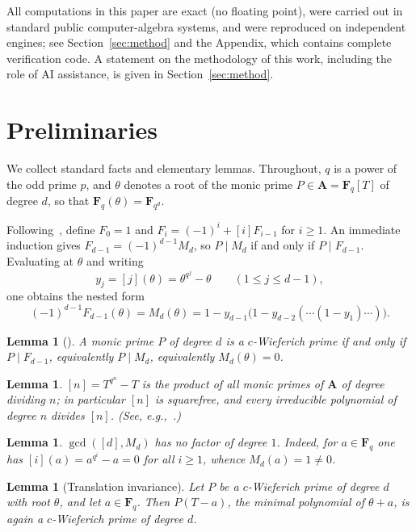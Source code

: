 \documentclass[10pt,a4paper]{amsart}
\newcommand{\A}{\mathbf{A}}
\newcommand{\F}{\mathbf{F}}
\newtheorem{lemma}[theorem]{Lemma}
\begin{document}
All computations in this paper are exact (no floating point), were carried out
in standard public computer-algebra systems, and were reproduced on independent
engines; see Section~\ref{sec:method} and the Appendix, which contains complete
verification code. A statement on the methodology of this work, including the
role of AI assistance, is given in Section~\ref{sec:method}.

\section{Preliminaries}

We collect standard facts and elementary lemmas. Throughout, $q$ is a power of
the odd prime $p$, and $\theta$ denotes a root of the monic prime
$P\in\A=\F_q[T]$ of degree $d$, so that $\F_q(\theta)=\F_{q^d}$.

Following~\cite{BB}, define $F_0=1$ and $F_i=(-1)^i+[i]F_{i-1}$ for $i\ge1$. An
immediate induction gives $F_{d-1}=(-1)^{d-1}M_d$, so $P\mid M_d$ if and only if
$P\mid F_{d-1}$. Evaluating at $\theta$ and writing
\[
y_j=[j](\theta)=\theta^{q^j}-\theta\qquad(1\le j\le d-1),
\]
one obtains the nested form
\begin{equation}\label{eq:nested}
(-1)^{d-1}F_{d-1}(\theta)=M_d(\theta)=1-y_{d-1}\bigl(1-y_{d-2}(\cdots(1-y_1)\cdots)\bigr).
\end{equation}

\begin{lemma}[{\cite[Prop.~1.2]{BB}}]\label{lem:equiv}
A monic prime $P$ of degree $d$ is a $c$-Wieferich prime if and only if
$P\mid F_{d-1}$, equivalently $P\mid M_d$, equivalently $M_d(\theta)=0$.
\end{lemma}

\begin{lemma}\label{lem:sqfree}
$[n]=T^{q^n}-T$ is the product of all monic primes of $\A$ of degree dividing
$n$; in particular $[n]$ is squarefree, and every irreducible polynomial of
degree $n$ divides $[n]$. (See, e.g.,~\cite[Ch.~2]{Ros}.)
\end{lemma}

\begin{lemma}\label{lem:nolinear}
$\gcd([d],M_d)$ has no factor of degree $1$. Indeed, for $a\in\F_q$ one has
$[i](a)=a^{q^i}-a=0$ for all $i\ge1$, whence $M_d(a)=1\neq0$.
\end{lemma}

\begin{lemma}[Translation invariance]\label{lem:transl}
Let $P$ be a $c$-Wieferich prime of degree $d$ with root $\theta$, and let
$a\in\F_q$. Then $P(T-a)$, the minimal polynomial of $\theta+a$, is again a
$c$-Wieferich prime of degree $d$.
\end{lemma}
\end{document}
